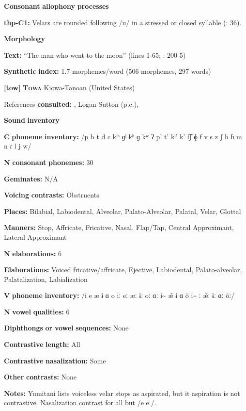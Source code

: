 \begin{styleBody}
\textbf{Consonant} \textbf{allophony} \textbf{processes}

\textbf{thp-C1:} Velars are rounded following /u/ in a stressed or closed syllable (\citealt{ThompsonThompson1992}: 36).

\textbf{Morphology}

\textbf{Text:} “The man who went to the moon” (lines 1-65; \citealt{ThompsonThompson1992}: 200-5)

\textbf{Synthetic} \textbf{index:} 1.7 morphemes/word (506 morphemes, 297 words)

\textbf{[tow]}   \textbf{\textsc{Towa}  }  Kiowa-Tanoan (United States)

References \textbf{consulted:} \citet{Bell1993}, Logan Sutton (p.c.), \citet{Yumitani1998}

\textbf{Sound} \textbf{inventory}

\textbf{C} \textbf{phoneme} \textbf{inventory:} /p b t d c kʲʰ ɡʲ kʰ ɡ kʷ ʔ p’ t’ kʲ’ k’ t͡ʃ ɸ f v s z ʃ h ɦ m n ɾ l j w/

\textbf{N} \textbf{consonant} \textbf{phonemes:} 30

\textbf{Geminates:} N/A

\textbf{Voicing} \textbf{contrasts:} Obstruents

\textbf{Places:} Bilabial, Labiodental, Alveolar, Palato-Alveolar, Palatal, Velar, Glottal

\textbf{Manners:} Stop, Affricate, Fricative, Nasal, Flap/Tap, Central Approximant, Lateral Approximant

\textbf{N} \textbf{elaborations:} 6

\textbf{Elaborations:} Voiced fricative/affricate, Ejective, Labiodental, Palato-alveolar, Palatalization, Labialization

\textbf{V} \textbf{phoneme} \textbf{inventory:} /i e æ ɨ ɑ o iː eː æː ɨː oː ɑː i\~{}  \~{æ} ɨ ɑ õ i\~{} ː \~{æ}ː ɨː ɑː õː/

\textbf{N} \textbf{vowel} \textbf{qualities:} 6

\textbf{Diphthongs} \textbf{or} \textbf{vowel} \textbf{sequences:} None

\textbf{Contrastive} \textbf{length:} All

\textbf{Contrastive} \textbf{nasalization:} Some

\textbf{Other} \textbf{contrasts:} None

\textbf{Notes:} Yumitani lists voiceless velar stops as aspirated, but it aspiration is not contrastive. Nasalization contrast for all but /e eː/.


\end{styleBody}
